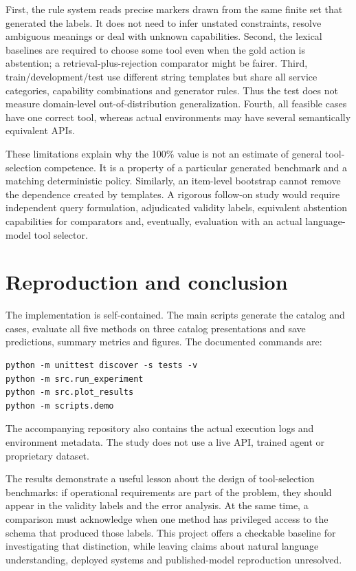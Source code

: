 \documentclass[10pt,a4paper]{article}
\begin{document}
First, the rule system reads precise markers drawn from the same finite set that generated the labels. It does not need to infer unstated constraints, resolve ambiguous meanings or deal with unknown capabilities. Second, the lexical baselines are required to choose some tool even when the gold action is abstention; a retrieval-plus-rejection comparator might be fairer. Third, train/development/test use different string templates but share all service categories, capability combinations and generator rules. Thus the test does not measure domain-level out-of-distribution generalization. Fourth, all feasible cases have one correct tool, whereas actual environments may have several semantically equivalent APIs.

These limitations explain why the 100\% value is not an estimate of general tool-selection competence. It is a property of a particular generated benchmark and a matching deterministic policy. Similarly, an item-level bootstrap cannot remove the dependence created by templates. A rigorous follow-on study would require independent query formulation, adjudicated validity labels, equivalent abstention capabilities for comparators and, eventually, evaluation with an actual language-model tool selector.

\section{Reproduction and conclusion}
The implementation is self-contained. The main scripts generate the catalog and cases, evaluate all five methods on three catalog presentations and save predictions, summary metrics and figures. The documented commands are:
\begin{verbatim}
python -m unittest discover -s tests -v
python -m src.run_experiment
python -m src.plot_results
python -m scripts.demo
\end{verbatim}
The accompanying repository also contains the actual execution logs and environment metadata. The study does not use a live API, trained agent or proprietary dataset.

The results demonstrate a useful lesson about the design of tool-selection benchmarks: if operational requirements are part of the problem, they should appear in the validity labels and the error analysis. At the same time, a comparison must acknowledge when one method has privileged access to the schema that produced those labels. This project offers a checkable baseline for investigating that distinction, while leaving claims about natural language understanding, deployed systems and published-model reproduction unresolved.
\end{document}
